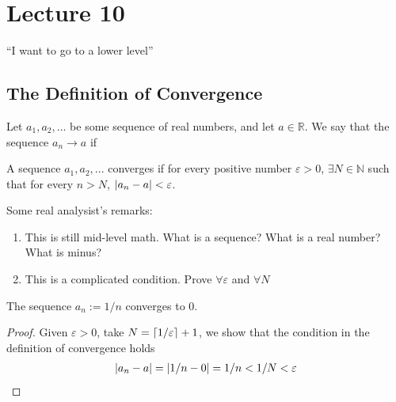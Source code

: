 \section{Lecture 10}
``I want to go to a lower level''
\subsection{The Definition of Convergence}
Let $a_1, a_2, ...$ be some sequence of real numbers, and let $a \in \mathbb{R}$. We say that the sequence $a_n \to a$ if
\begin{definition}
    A sequence $a_1, a_2, ...$ converges if for every positive number $\varepsilon > 0$, $\exists N \in \mathbb{N}$ such that for every $n > N$, $\abs{a_n - a} < \varepsilon$.
\end{definition}
\noindent Some real analysist's remarks:
\begin{enumerate}
    \item This is still mid-level math. What is a sequence? What is a real number? What is minus?
    \item This is a complicated condition. Prove $\forall \varepsilon$ and $\forall N$
\end{enumerate}

\begin{lemma}
    The sequence $a_n := 1/n$ converges to $0$.
\end{lemma}
\begin{proof}
    Given $\varepsilon > 0$, take $N = \lceil1/\varepsilon\rceil + 1$, we show that the condition in the definition of convergence holds
    \begin{align}
        \abs{a_n - a} = \abs{1/n - 0} = 1/n < 1/N < \varepsilon
    \end{align}
\end{proof}

